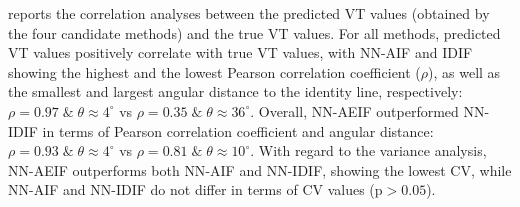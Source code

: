     
    reports the correlation analyses between the predicted \gls{VT} values (obtained by the four candidate methods) and the true \gls{VT} values. For all methods, predicted \gls{VT} values positively correlate with true \gls{VT} values, with \gls{NN}-\gls{AIF} and \gls{IDIF} showing the highest and the lowest Pearson correlation coefficient ($\rho$), as well as the smallest and largest angular distance to the identity line, respectively: $\rho = 0.97 \; \& \;  \theta \approx 4^{\circ}$ vs $\rho = 0.35 \; \&  \; \theta \approx 36^{\circ}$. Overall, \gls{NN}-\gls{AE}\gls{IF} outperformed \gls{NN}-\gls{IDIF} in terms of Pearson correlation coefficient and angular distance: $\rho = 0.93 \; \& \; \theta  \approx 4^{\circ}$ vs $\rho = 0.81 \; \&  \; \theta \approx 10^{\circ}$. With regard to the variance analysis, \gls{NN}-\gls{AE}\gls{IF} outperforms both \gls{NN}-\gls{AIF} and \gls{NN}-\gls{IDIF}, showing the lowest \gls{CV}, while \gls{NN}-\gls{AIF} and \gls{NN}-\gls{IDIF} do not differ in terms of \gls{CV} values (p$>0.05$).

